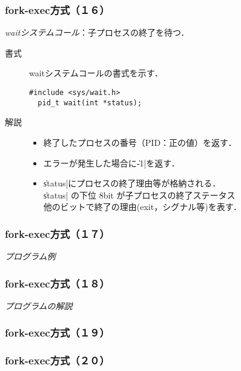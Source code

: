\documentclass{beamer}                 %
\begin{document}
\begin{frame}[fragile]
  \frametitle{fork-exec方式（１６）}
  \emph{waitシステムコール}：子プロセスの終了を待つ．

  \begin{description}
  \item[書式] waitシステムコールの書式を示す．

\begin{lstlisting}[numbers=none]
  #include <sys/wait.h>
  pid_t wait(int *status);
\end{lstlisting}

  \item[解説] 
    \begin{itemize}
    \item 終了したプロセスの番号（PID：正の値）を返す．
    \item エラーが発生した場合に\|-1|を返す．
    \item \|status|にプロセスの終了理由等が格納される．\\
      \|status| の下位 8bit が子プロセスの終了ステータス \\
      他のビットで終了の理由(exit，シグナル等)を表す．
    \end{itemize}
  \end{description}
\end{frame}

\begin{frame}[fragile]
  \frametitle{fork-exec方式（１７）}
  \emph{プログラム例}
\end{frame}

\begin{frame}[fragile]
  \frametitle{fork-exec方式（１８）}
  \emph{プログラムの解説}
\end{frame}

\begin{frame}[fragile]
  \frametitle{fork-exec方式（１９）}
\end{frame}

\begin{frame}[fragile]
  \frametitle{fork-exec方式（２０）}
\end{frame}
\end{document}
